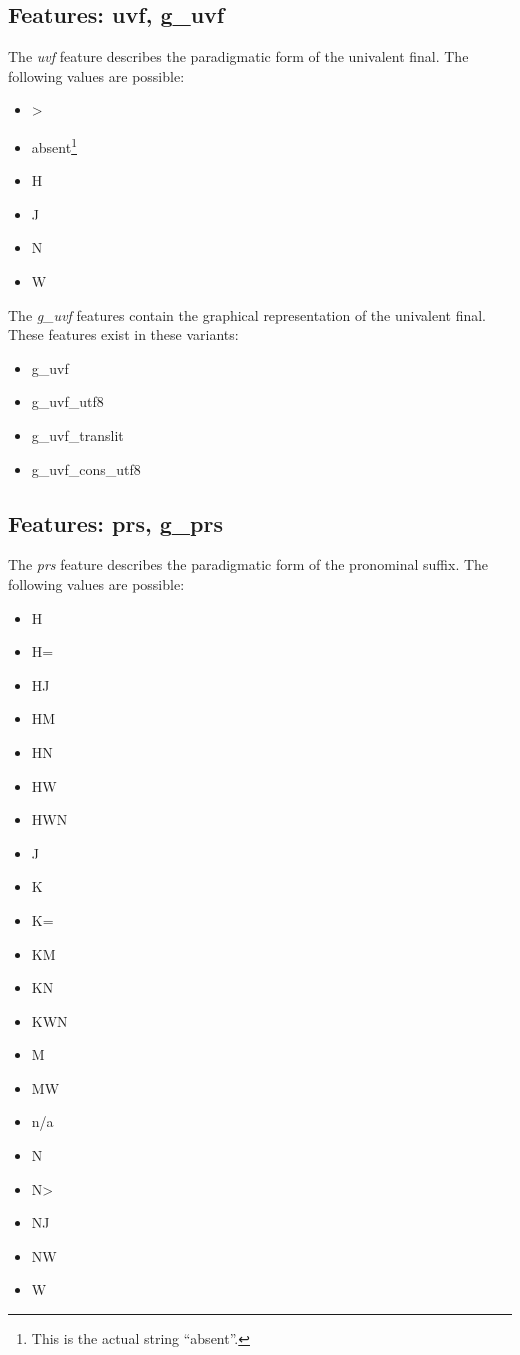 \documentclass[11pt,oneside,a4paper]{memoir}
\begin{document}
\subsection{Features: uvf, g\_uvf}

The \emph{uvf} feature describes the paradigmatic form of the univalent final. The following
values are possible:

\begin{itemize}
\item >
\item absent\footnote{This is the actual string ``absent''.}
\item H
\item J
\item N
\item W
\end{itemize}

The \emph{g\_uvf} features contain the graphical representation of the univalent final.
These features exist in these variants:

\begin{itemize}
\item g\_uvf
\item g\_uvf\_utf8
\item g\_uvf\_translit
\item g\_uvf\_cons\_utf8
\end{itemize}


\subsection{Features: prs, g\_prs}\label{prs}

The \emph{prs} feature describes the paradigmatic form of the pronominal suffix. The following
values are possible:

\begin{itemize}
\item H  
\item H= 
\item HJ 
\item HM 
\item HN 
\item HW 
\item HWN
\item J  
\item K  
\item K= 
\item KM 
\item KN 
\item KWN
\item M  
\item MW 
\item n/a
\item N  
\item N> 
\item NJ 
\item NW 
\item W  
\end{itemize}
\end{document}
